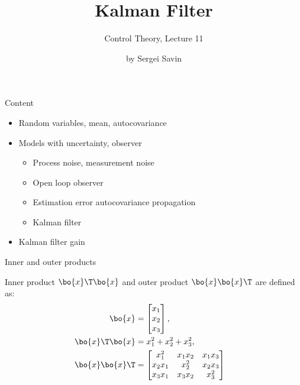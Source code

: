 \documentclass{beamer}
\title{Kalman Filter}
\subtitle{Control Theory, Lecture 11}
\author{by Sergei Savin}
\date{\mydate}
\begin{document}
\maketitle



\begin{frame}{Content}
\begin{itemize}
\item Random variables, mean, autocovariance
\item Models with uncertainty, observer
\begin{itemize}
	\item Process noise, measurement noise
	\item Open loop observer
	\item Estimation error autocovariance propagation
	\item Kalman filter
\end{itemize}
\item Kalman filter gain
\end{itemize}
\end{frame}




\begin{frame}{Inner and outer products}
	\begin{flushleft}
		
		Inner product $\bo{x}\T \bo{x}$ and outer product $\bo{x}\bo{x}\T$ are defined as:
		\begin{align*}
			\bo{x} &= 
			\begin{bmatrix}
				x_1 \\ x_2 \\ x_3
			\end{bmatrix},& 
			\\
			\bo{x}\T \bo{x} &= x_1^2+x_2^2+x_3^2, 
			\\
			\bo{x}\bo{x}\T &= 
			\begin{bmatrix}
				x_1^2    & x_1 x_2 & x_1 x_3 \\ 
				x_2 x_1 & x_2^2    & x_2 x_3 \\ 
				x_3 x_1 & x_3 x_2 & x_3^2
			\end{bmatrix}
		\end{align*}	
		
	\end{flushleft}
\end{frame}
\end{document}
